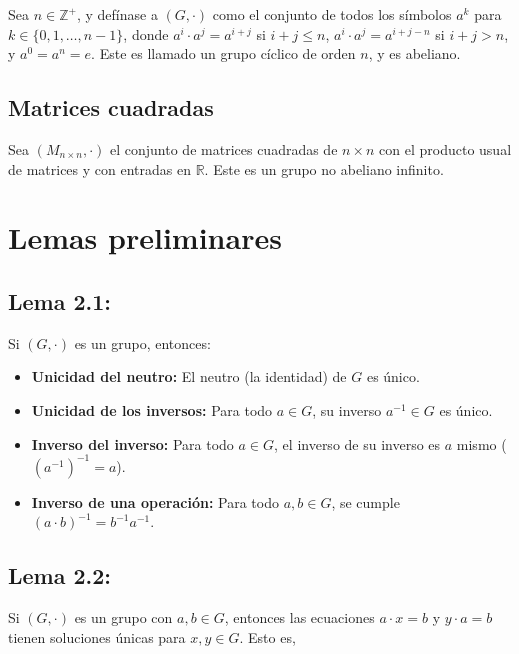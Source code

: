 \documentclass{article}
\begin{document}
Sea $n\in\mathbb{Z}^+$, y defínase a $(G,\cdot)$ como el conjunto de todos los símbolos $a^k$ para $k\in\{0,1,\ldots,n-1\}$, donde $a^i\cdot a^j=a^{i+j}$ si $i+j\leq n$, $a^i\cdot a^j=a^{i+j-n}$ si $i+j> n$, y $a^0=a^n=e$. Este es llamado un grupo cíclico de orden $n$, y es abeliano.

\subsection*{\color{teal} Matrices cuadradas}

Sea $(M_{n\times n},\cdot)$ el conjunto de matrices cuadradas de $n\times n$ con el producto usual de matrices y con entradas en $\mathbb{R}$. Este es un grupo no abeliano infinito.

\newpage
\section{Lemas preliminares}

\subsection*{\color{blue} Lema 2.1:}

Si $(G,\cdot)$ es un grupo, entonces:

\begin{itemize}
\item \textbf{Unicidad del neutro:} El neutro (la identidad) de $G$ es único.

\item \textbf{Unicidad de los inversos:} Para todo $a\in G$, su inverso $a^{-1}\in G$ es único.

\item \textbf{Inverso del inverso:} Para todo $a\in G$, el inverso de su inverso es $a$ mismo ($(a^{-1})^{-1}=a$).

\item \textbf{Inverso de una operación:} Para todo $a,b\in G$, se cumple $(a\cdot b)^{-1}=b^{-1}a^{-1}$.
\end{itemize}

\subsection*{\color{blue} Lema 2.2:}

Si $(G,\cdot)$ es un grupo con $a,b\in G$, entonces las ecuaciones $a\cdot x=b$ y $y\cdot a=b$ tienen soluciones únicas para $x,y\in G$. Esto es,
\end{document}
